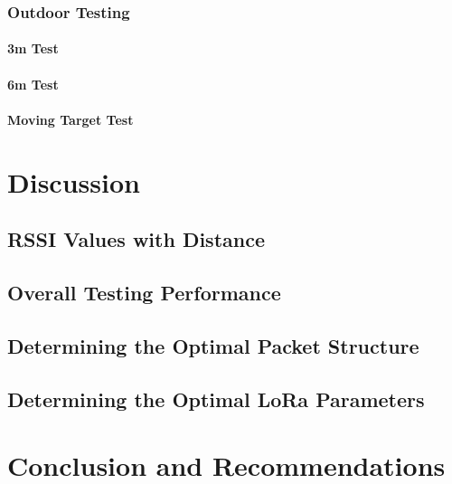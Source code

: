 \documentclass[11pt]{report}
\begin{document}
\subsection{Outdoor Testing}
\subsubsection{3m Test}
\subsubsection{6m Test}
\subsubsection{Moving Target Test}



\chapter{Discussion}\label{ch:discussion}

\section{RSSI Values with Distance}

\section{Overall Testing Performance}


\section{Determining the Optimal Packet Structure}\label{sec:optimalpacketstructure}


\section{Determining the Optimal LoRa Parameters}




\chapter{Conclusion and Recommendations}\label{ch:conclusionandrecommendations}
\end{document}
